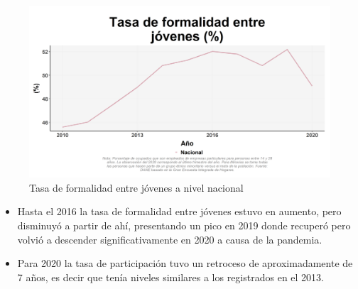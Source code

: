     \begin{figure}[H]
        \caption{Tasa de formalidad entre jóvenes a nivel nacional \label{map_result_2} }
        \begin{center}
        \includegraphics[width=\textwidth,keepaspectratio]{img/var_66_trend.png}
        \end{center}
    \end{figure}
            \begin{itemize}
                \item Hasta el 2016 la tasa de formalidad entre jóvenes estuvo en aumento, pero disminuyó a partir de ahí, presentando un pico en 2019 donde recuperó pero volvió a descender significativamente en 2020 a causa de la pandemia.
                \item Para 2020 la tasa de participación tuvo un retroceso de aproximadamente de 7 años, es decir que tenía niveles similares a los registrados en el 2013.
                \end{itemize}

